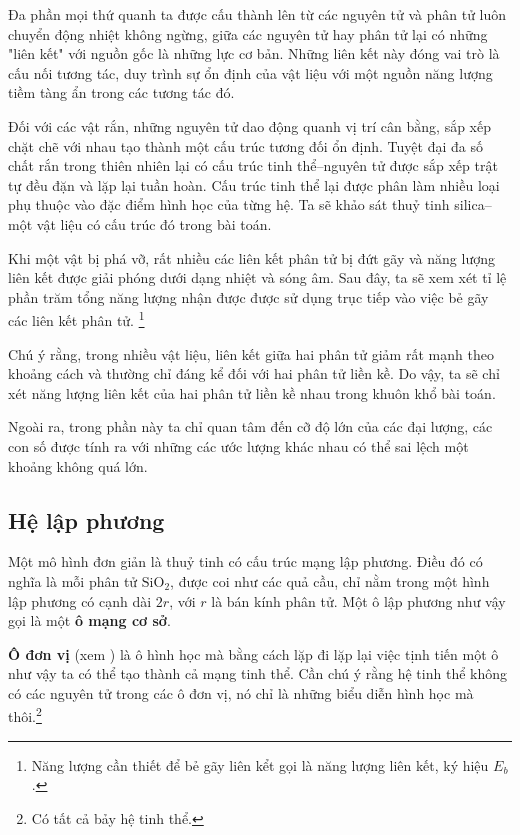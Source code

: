 
Đa phần mọi thứ quanh ta được cấu thành lên từ các nguyên tử và phân tử luôn chuyển động nhiệt không ngừng, giữa các nguyên tử hay phân tử lại có những "liên kết" với nguồn gốc là những lực cơ bản. Những liên kết này đóng vai trò là cấu nối tương tác, duy trình sự ổn định của vật liệu với một nguồn năng lượng tiềm tàng ẩn trong các tương tác đó.



Đối với các vật rắn, những nguyên tử dao động quanh vị trí cân bằng, sắp xếp chặt chẽ với nhau tạo thành một cấu trúc tương đối ổn định. Tuyệt đại đa số chất rắn trong thiên nhiên lại có cấu trúc tinh thể--nguyên tử được sắp xếp trật tự đều đặn và lặp lại tuần hoàn. Cấu trúc tinh thể lại được phân làm nhiều loại phụ thuộc vào đặc điểm hình học của từng hệ.
Ta sẽ khảo sát thuỷ tinh silica--một vật liệu có cấu trúc đó trong bài toán.
\vspace{8pt}

Khi một vật bị phá vỡ, rất nhiều các liên kết phân tử bị đứt gãy và năng lượng liên kết được giải phóng dưới dạng nhiệt và sóng âm. Sau đây, ta sẽ xem xét tỉ lệ phần trăm tổng năng lượng nhận được được sử dụng trục tiếp vào việc bẻ gãy các liên kết phân tử. \footnote{ Năng lượng cần thiết để bẻ gãy liên kểt gọi là năng lượng liên kết, ký hiệu $E_b$.}
\vspace{8pt}

Chú ý rằng, trong nhiều vật liệu, liên kết giữa hai phân tử giảm rất mạnh theo khoảng cách và thường chỉ đáng kể đối với hai phân tử liền kề. Do vậy, ta sẽ chỉ xét năng lượng liên kết của hai phân tử liền kề nhau trong khuôn khổ bài toán.
\vspace{8pt}
 
Ngoài ra, trong phần này ta chỉ quan tâm đến cỡ độ lớn của các đại lượng, các con số được tính ra với những các ước lượng khác nhau có thể sai lệch một khoảng không quá lớn.

\subsection*{Hệ lập phương}
 
Một mô hình đơn giản là thuỷ tinh có cấu trúc mạng lập phương. Điều đó có nghĩa là mỗi phân tử $\mathrm{SiO_2}$, được coi như các quả cầu, chỉ nằm trong một hình lập phương có cạnh dài $2r$, với $r$ là bán kính phân tử. Một ô lập phương như vậy gọi là một \textbf{ô mạng cơ sở}.
\vspace{8pt}

\textbf{Ô đơn vị} (xem ) là ô hình học mà bằng cách lặp đi lặp lại việc tịnh tiến một ô như vậy ta có thể tạo thành cả mạng tinh thể. Cần chú ý rằng hệ tinh thể không có các nguyên tử trong các ô đơn vị, nó chỉ là những biểu diễn hình học mà thôi.\footnote{ Có tất cả bảy hệ tinh thể.}
\vspace{8pt}

